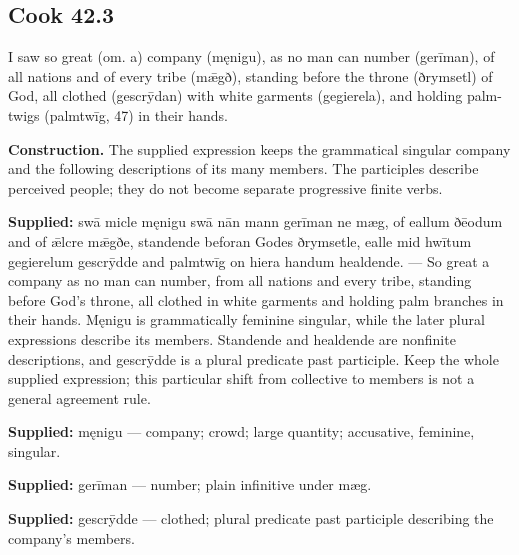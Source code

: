\par\begin{minipage}{\linewidth}\raggedright
\subsection*{Cook 42.3}

I saw so great (om. a) company (męnigu), as no man can number (gerīman), of all nations and of every tribe (mǣgð), standing before the throne (ðrymsetl) of God, all clothed (gescrȳdan) with white garments (gegierela), and holding palm-twigs (palmtwīg, 47) in their hands.

\end{minipage}\par\addvspace{4pt}

\textbf{Construction.} The supplied expression keeps the grammatical singular company and the following descriptions of its many members. The participles describe perceived people; they do not become separate progressive finite verbs.

\textbf{Supplied:} swā micle męnigu swā nān mann gerīman ne mæg, of eallum ðēodum and of ǣlcre mǣgðe, standende beforan Godes ðrymsetle, ealle mid hwītum gegierelum gescrȳdde and palmtwīg on hiera handum healdende. — So great a company as no man can number, from all nations and every tribe, standing before God’s throne, all clothed in white garments and holding palm branches in their hands. Męnigu is grammatically feminine singular, while the later plural expressions describe its members. Standende and healdende are nonfinite descriptions, and gescrȳdde is a plural predicate past participle. Keep the whole supplied expression; this particular shift from collective to members is not a general agreement rule.

\textbf{Supplied:} męnigu — company; crowd; large quantity; accusative, feminine, singular.

\textbf{Supplied:} gerīman — number; plain infinitive under mæg.

\textbf{Supplied:} gescrȳdde — clothed; plural predicate past participle describing the company’s members.

